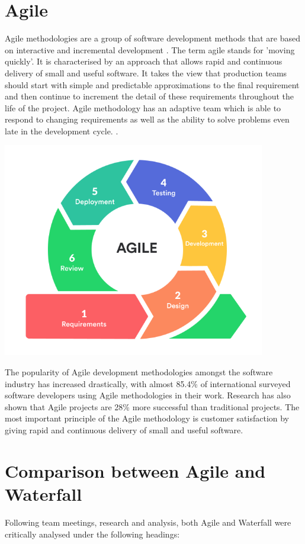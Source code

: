 \section{Agile}
Agile methodologies are a group of software development methods that are based on interactive and incremental development \cite{kumar2012impact}. The term agile stands for 'moving quickly'. It is characterised by an approach that allows rapid and continuous delivery of small and useful software. It takes the view  that production teams should start with simple and predictable approximations to the final requirement and then continue to increment the detail of these requirements throughout the life of the project. Agile methodology has an adaptive team which is able to respond to changing requirements as well as the ability to solve problems even late in the development cycle. \cite{balaji2012waterfall}.
\begin{center}
      \includegraphics[scale=0.8]{img/Agile.png}
\end{center}
The popularity of Agile development methodologies amongst the software industry has increased drastically, with almost 85.4\% of international surveyed software developers using Agile methodologies in their work. \cite{agileStats} Research has also shown that Agile projects are 28\% more successful than traditional projects. The most important principle of the Agile methodology is customer satisfaction by giving rapid and continuous delivery of small and useful software.

\section{Comparison between Agile and Waterfall}
Following team meetings, research and analysis, both Agile and Waterfall were critically analysed under the following headings:

